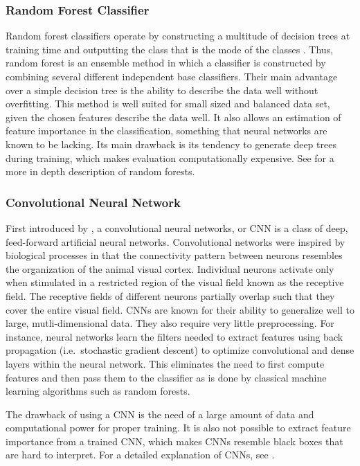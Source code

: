 		\subsubsection{Random Forest Classifier}\label{rand_forest_class}
			Random forest classifiers operate by constructing a multitude of decision trees at training time and outputting the class that is the mode of the classes \citep{Ho1995}. Thus, random forest is an ensemble method in which a classifier is constructed by combining several different independent base classifiers. Their main advantage over a simple decision tree is the ability to describe the data well without overfitting. 			
			This method is well suited for small sized and balanced data set, given the chosen features describe the data well. It also allows an estimation of feature importance in the classification, something that neural networks are known to be lacking. Its main drawback is its tendency to generate deep trees during training, which makes evaluation computationally expensive. See \citet{BishopBook} for a more in depth description of random forests. 
			
		\subsubsection{Convolutional Neural Network}
			First introduced by \citet{AlexNet}, a convolutional neural networks, or CNN is a class of deep, feed-forward artificial neural networks. Convolutional networks were inspired by biological processes in that the connectivity pattern between neurons resembles the organization of the animal visual cortex. Individual neurons activate only when stimulated in a restricted region of the visual field known as the receptive field. The receptive fields of different neurons partially overlap such that they cover the entire visual field. CNNs are known for their ability to generalize well to large, mutli-dimensional data. They also require very little preprocessing. For instance, neural networks learn the filters needed to extract features using back propagation (i.e.\ stochastic gradient descent) to optimize convolutional and dense layers within the neural network. This eliminates the need to first compute features and then pass them to the classifier as is done by classical machine learning algorithms such as random forests.
			
			The drawback of using a CNN is the need of a large amount of data and computational power for proper training. It is also not possible to extract feature importance from a trained CNN, which makes CNNs resemble black boxes that are hard to interpret.  
			 For a detailed explanation of CNNs, see \citet{NNMethods}.
		


